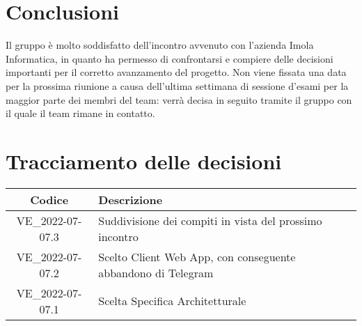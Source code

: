 \section{Conclusioni}
Il gruppo è molto soddisfatto dell'incontro avvenuto con l'azienda Imola Informatica, in quanto ha permesso di confrontarsi e compiere delle decisioni importanti per il corretto avanzamento del progetto. Non viene fissata una data per la prossima riunione a causa dell'ultima settimana di sessione d'esami per la maggior parte dei membri del team: verrà decisa in seguito tramite il gruppo  con il quale il team rimane in contatto. 
\newpage

\section*{Tracciamento delle decisioni}
	\renewcommand{\arraystretch}{1.8} %
	\begin{tabular}{ |c|l| }
		\hline
		\textbf{Codice} & \textbf{Descrizione} \\
		\hline
		VE\_2022-07-07.3 & Suddivisione dei compiti in vista del prossimo incontro\\ 
		\hline
		VE\_2022-07-07.2 & Scelto Client Web App, con conseguente abbandono di Telegram\\ %
		\hline
		VE\_2022-07-07.1 & Scelta Specifica Architetturale \glossario{Stateless} \\ %
		\hline
	\end{tabular}